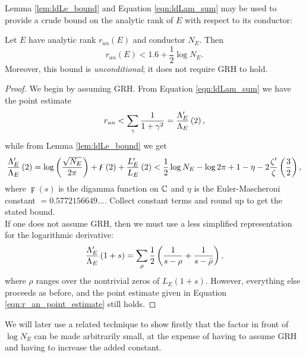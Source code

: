 Lemma \ref{lem:ldLe_bound} and Equation \ref{eqn:ldLam_sum} may be used to provide a crude bound on the analytic rank of $E$ with respect to its conductor:
\begin{corollary}\label{cor:logderiv_rank_bound}
Let $E$ have analytic rank $r_{an}(E)$ and conductor $N_E$. Then
\begin{equation}
r_{an}(E) < 1.6 + \frac{1}{2} \log N_E.
\end{equation}
Moreover, this bound is {\it unconditional}; it does not require GRH to hold.
\end{corollary}
\begin{proof}
We begin by assuming GRH. From Equation \ref{eqn:ldLam_sum} we have the point estimate
\begin{equation}\label{eqn:r_an_point_estimate}
r_{an} < \sum_{\gamma} \frac{1}{1+\gamma^2} = \frac{\Lambda_E^{\prime}}{\Lambda_E}\left(2\right),
\end{equation}
while from Lemma \ref{lem:ldLe_bound} we get
\begin{equation}
\frac{\Lambda_E^{\prime}}{\Lambda_E}\left(2\right) =  \log\left(\frac{\sqrt{N_E}}{2\pi}\right) + \digamma(2) + \frac{L_E^{\prime}}{L_E}\left(2\right) < \frac{1}{2}\log N_E  - \log 2\pi + 1-\eta -2\frac{\zeta^{\prime}}{\zeta}\left(\frac{3}{2}\right),
\end{equation}
where $\digamma(s)$ is the digamma function on $\mathbb{C}$ and $\eta$ is the Euler-Mascheroni constant $= 0.5772156649\ldots$. Collect constant terms and round up to get the stated bound. \\

If one does not assume GRH, then we must use a less simplified representation for the logarithmic derivative:
\begin{equation}
\frac{\Lambda_E^{\prime}}{\Lambda_E}\left(1+s\right) = \sum_{\rho} \frac{1}{2}\left( \frac{1}{s-\rho} + \frac{1}{s-\bar{\rho}}\right),
\end{equation}
where $\rho$ ranges over the nontrivial zeros of $L_E(1+s)$. However, everything else proceeds as before, and the point estimate given in Equation \ref{eqn:r_an_point_estimate} still holds.
\end{proof}
We will later use a related technique to show firstly that the factor in front of $\log N_E$ can be made arbitrarily small, at the expense of having to assume GRH and having to increase the added constant. \\


